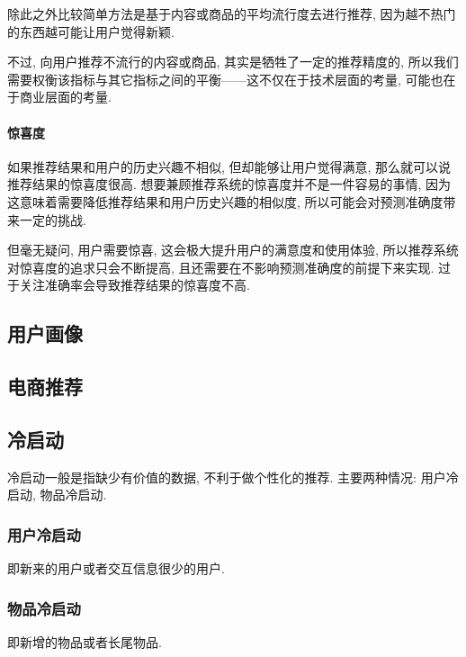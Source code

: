 除此之外比较简单方法是基于内容或商品的平均流行度去进行推荐, 因为越不热门的东西越可能让用户觉得新颖. 

不过, 向用户推荐不流行的内容或商品, 其实是牺牲了一定的推荐精度的, 所以我们需要权衡该指标与其它指标之间的平衡——这不仅在于技术层面的考量, 可能也在于商业层面的考量. 

\paragraph{惊喜度}如果推荐结果和用户的历史兴趣不相似, 但却能够让用户觉得满意, 那么就可以说推荐结果的惊喜度很高. 想要兼顾推荐系统的惊喜度并不是一件容易的事情, 因为这意味着需要降低推荐结果和用户历史兴趣的相似度, 所以可能会对预测准确度带来一定的挑战. 

但毫无疑问, 用户需要惊喜, 这会极大提升用户的满意度和使用体验, 所以推荐系统对惊喜度的追求只会不断提高, 且还需要在不影响预测准确度的前提下来实现. 过于关注准确率会导致推荐结果的惊喜度不高. 



\subsection{用户画像}

\subsection{电商推荐}

\subsection{冷启动}
冷启动一般是指缺少有价值的数据, 不利于做个性化的推荐. 主要两种情况: 用户冷启动, 物品冷启动. 

\subsubsection{用户冷启动}

即新来的用户或者交互信息很少的用户. 

\subsubsection{物品冷启动}

即新增的物品或者长尾物品. 

